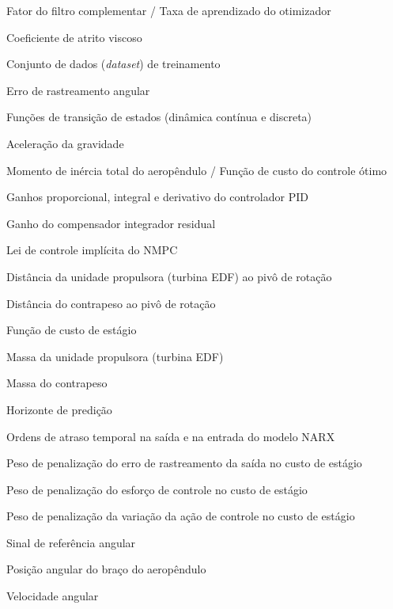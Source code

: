 \begin{simbolos}
    \item[$ \alpha $] Fator do filtro complementar / Taxa de aprendizado do otimizador
    \item[$ b $] Coeficiente de atrito viscoso
    \item[$ \mathcal{D} $] Conjunto de dados (\textit{dataset}) de treinamento
    \item[$ e $] Erro de rastreamento angular
    \item[$ f(\cdot), F(\cdot) $] Funções de transição de estados (dinâmica contínua e discreta)
    \item[$ g $] Aceleração da gravidade
    \item[$ J $] Momento de inércia total do aeropêndulo / Função de custo do controle ótimo
    \item[$ K_p, K_i, K_d $] Ganhos proporcional, integral e derivativo do controlador PID
    \item[$ K_{i,\text{res}} $] Ganho do compensador integrador residual
    \item[$ \kappa_N(\cdot) $] Lei de controle implícita do NMPC
    \item[$ L_1 $] Distância da unidade propulsora (turbina EDF) ao pivô de rotação
    \item[$ L_2 $] Distância do contrapeso ao pivô de rotação
    \item[$ \ell(\cdot) $] Função de custo de estágio
    \item[$ m_1 $] Massa da unidade propulsora (turbina EDF)
    \item[$ m_2 $] Massa do contrapeso
    \item[$ N $] Horizonte de predição
    \item[$ n_y, n_u $] Ordens de atraso temporal na saída e na entrada do modelo NARX
    \item[$ q_y $] Peso de penalização do erro de rastreamento da saída no custo de estágio
    \item[$ r_u $] Peso de penalização do esforço de controle no custo de estágio
    \item[$ r_{\Delta u} $] Peso de penalização da variação da ação de controle no custo de estágio
    \item[$ r $] Sinal de referência angular
    \item[$ \theta $] Posição angular do braço do aeropêndulo
    \item[$ \dot{\theta} $] Velocidade angular

\end{simbolos}
